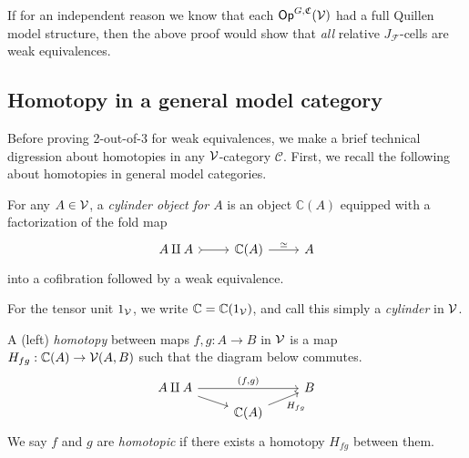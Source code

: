\documentclass[a4paper,10pt
,draft
]{article}%
\renewcommand{\F}{\mathcal F}
\renewcommand{\1}{\eta}%
\begin{document}
\begin{remark}
      \label{OPGCV_F_JC_REM}
      If for an independent reason we know that each $\mathsf{Op}^{G, \mathfrak C}(\mathcal V)$ had a full Quillen model structure,
      then the above proof would show that \textit{all} relative $J_\F$-cells are weak equivalences.
\end{remark}


\subsection{Homotopy in a general model category}

Before proving 2-out-of-3 for weak equivalences, we make a brief technical digression about homotopies in any $\mathcal V$-category $\mathcal C$.
First, we recall the following about homotopies in general model categories.
\begin{definition}
      For any $A \in \mathcal V$, a \textit{cylinder object for $A$} is an object $\mathbb C(A)$ equipped with a factorization of the fold map
      \begin{equation}
            \begin{tikzcd}
                  A \amalg A \arrow[r, tail]
                  &
                  \mathbb C(A) \arrow[r, "\simeq"]
                  &
                  A
            \end{tikzcd}
      \end{equation}
      into a cofibration followed by a weak equivalence.
      
      For the tensor unit $1_{\mathcal V}$, we write $\mathbb C = \mathbb C(1_{\mathcal V})$, and call this simply a \textit{cylinder} in $\mathcal V$.
      
      A (left) \textit{homotopy} between maps $f,g: A \to B$ in $\mathcal V$ is a map $H_{fg}: \mathbb C(A) \to \mathcal V(A,B)$ such that
      the diagram below commutes.
      \begin{equation}
            \begin{tikzcd}[row sep = tiny]
                  A \amalg A \arrow[rr, "{(f,g)}"] \arrow[dr]
                  &&
                  B
                  \\
                  &
                  \mathbb C(A) \arrow[ur, "H_{fg}"']
            \end{tikzcd}
      \end{equation}
      We say $f$ and $g$ are \textit{homotopic} if there exists a homotopy $H_{f g}$ between them.
\end{definition}
\end{document}
